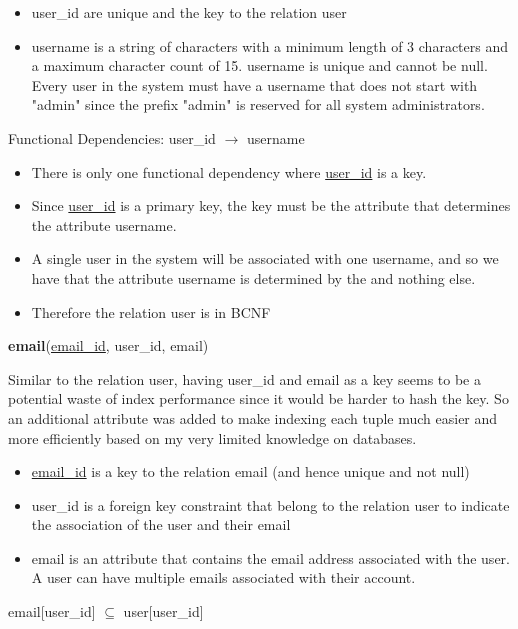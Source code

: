\documentclass{article}
\begin{document}
\begin{itemize}
    \item user\_id are unique and the key to the relation user
    \item username is a string of characters with a minimum length of 3 characters and a maximum character count of 15. username is unique and cannot be null. Every user in the system must have a username that does not start with "admin" since the prefix "admin" is reserved for all system administrators. 
\end{itemize}

Functional Dependencies: user\_id $\to$ username

\begin{itemize}
    \item There is only one functional dependency where \underline{user\_id} is a key.
    \item Since \underline{user\_id} is a primary key, the key must be the attribute that determines the attribute username. 
    \item A single user in the system will be associated with one username, and so we have that the attribute username is determined by the  and nothing else. 
    \item Therefore the relation user is in BCNF
\end{itemize}

\textbf{email}(\underline{email\_id}, user\_id, email)

Similar to the relation user, having user\_id and email as a key seems to be a potential waste of index performance since it would be harder to hash the key. So an additional attribute was added to make indexing each tuple much easier and more efficiently based on my very limited knowledge on databases. 

\begin{itemize}
    \item \underline{email\_id} is a key to the relation email (and hence unique and not null)
    \item user\_id is a foreign key constraint that belong to the relation user to indicate the association of the user and their email
    \item email is an attribute that contains the email address associated with the user. A user can have multiple emails associated with their account.
\end{itemize}

email[user\_id] $\subseteq$ user[user\_id]
\\
\end{document}
